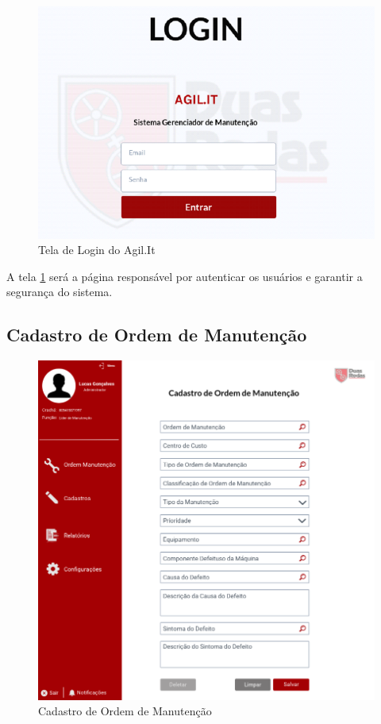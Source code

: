 \begin{figure}[htb]
	\caption{\label{web_login}Tela de Login do Agil.It}
	\begin{center}
		\includegraphics[scale=0.70]{./Figuras/web/login.png}
	\end{center}
\end{figure}

A tela \ref{web_login} será a página responsável por autenticar os usuários e garantir a segurança do sistema.

\newpage
\subsection{Cadastro de Ordem de Manutenção}

\begin{figure}[htb]
	\caption{\label{web_cad-om}Cadastro de Ordem de Manutenção}
	\begin{center}
		\includegraphics[scale=0.65]{./Figuras/web/cad-om.png}
	\end{center}
\end{figure}

